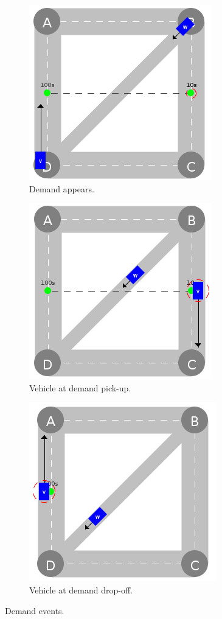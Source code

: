 \documentclass[graybox]{svmult}
\begin{document}
\begin{figure}
	\begin{subfigure}{.32\textwidth}
		\centering
		\includegraphics[scale=0.35]{../../events/demand.png}
		\caption{Demand appears.}
		\label{fig:demand-appears}
	\end{subfigure}
	\hfill
	\begin{subfigure}{.32\textwidth}
		\centering
		\includegraphics[scale=0.35]{../../events/vehicle-at-demand-pick-up.png}
		\caption{Vehicle at demand pick-up.}
		\label{fig:vehicle-at-demand-pick-up}
	\end{subfigure}
	\hfill
	\begin{subfigure}{.32\textwidth}
		\centering
		\includegraphics[scale=0.35]{../../events/vehicle-at-demand-drop-off.png}
		\caption{Vehicle at demand drop-off.}
		\label{fig:vehicle-at-demand-drop-off}
	\end{subfigure}
\hfill
	\caption{Demand events.}
	\label{fig:demand-events}	
\end{figure}
\end{document}
